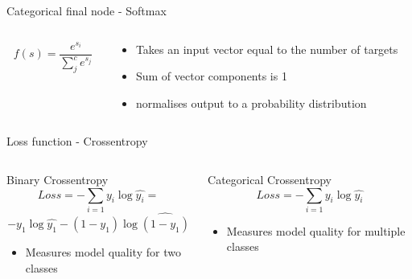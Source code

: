 \begin{frame}{Categorical final node - Softmax}
    \begin{columns}
        \begin{column}{0.5\textwidth}
            \begingroup
            \huge
            \begin{equation*}
                f(s)=\frac{e^{s_i}}{\sum_j^c e^{s_j}}
            \end{equation*}
            \endgroup
        \end{column}
        \begin{column}{0.5\textwidth}
            \begin{itemize}
                \item Takes an input vector equal to the number of targets
                \vspace{0.1cm}
                \item Sum of vector components is 1
                \vspace{0.1cm}
                \item normalises output to a probability distribution
            \end{itemize}
        \end{column}
    \end{columns}
\end{frame}

\begin{frame}{Loss function - Crossentropy}
    \begin{columns}
        \begin{column}{0.5\textwidth}
            \begin{block}{Binary Crossentropy}
                \begin{equation*}
                    Loss = - \sum_{i=1} y_i \log \hat{y_i} =
                \end{equation*}
                \begin{equation*}
                    -y_1 \log \hat{y_1} - (1-y_1) \log \hat{(1-y_1)}
                \end{equation*}
                \begin{itemize}
                    \item Measures model quality for two classes
                \end{itemize}
            \end{block}
        \end{column}
        \begin{column}{0.5\textwidth}
            \begin{block}{Categorical Crossentropy}
                \begin{equation*}
                    Loss = - \sum_{i=1} y_i \log \hat{y_i}
                \end{equation*}
                \begin{itemize}
                    \item Measures model quality for multiple classes
                \end{itemize}
            \end{block}
        \end{column}
    \end{columns}
\end{frame}
